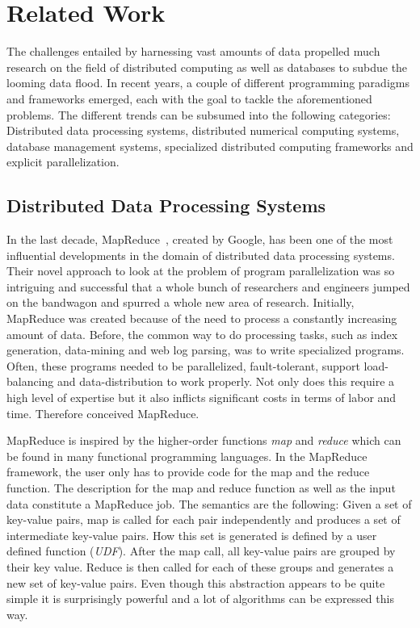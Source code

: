 \chapter{Related Work}
\label{cha:relatedwork}


The challenges entailed by harnessing vast amounts of data propelled much research on the field of distributed computing as well as databases to subdue the looming data flood.
In recent years, a couple of different programming paradigms and frameworks emerged, each with the goal to tackle the aforementioned problems.
The different trends can be subsumed into the following categories: Distributed data processing systems, distributed numerical computing systems, database management systems, specialized distributed computing frameworks and explicit parallelization.

\section{Distributed Data Processing Systems}

In the last decade, MapReduce~\cite{dean:c2008a}, created by Google, has been one of the most influential developments in the domain of distributed data processing systems.
Their novel approach to look at the problem of program parallelization was so intriguing and successful that a whole bunch of researchers and engineers jumped on the bandwagon and spurred a whole new area of research.
Initially, MapReduce was created because of the need to process a constantly increasing amount of data.
Before, the common way to do processing tasks, such as index generation, data-mining and web log parsing, was to write specialized programs.
Often, these programs needed to be parallelized, fault-tolerant, support load-balancing and data-distribution to work properly.
Not only does this require a high level of expertise but it also inflicts significant costs in terms of labor and time.
Therefore \citeauthor{dean:c2008a} conceived MapReduce.

MapReduce is inspired by the higher-order functions \emph{map} and \emph{reduce} which can be found in many functional programming languages.
In the MapReduce framework, the user only has to provide code for the map and the reduce function.
The description for the map and reduce function as well as the input data constitute a MapReduce job.
The semantics are the following:
Given a set of key-value pairs, map is called for each pair independently and produces a set of intermediate key-value pairs.
How this set is generated is defined by a user defined function (\emph{UDF}).
After the map call, all key-value pairs are grouped by their key value.
Reduce is then called for each of these groups and generates a new set of key-value pairs.
Even though this abstraction appears to be quite simple it is surprisingly powerful and a lot of algorithms can be expressed this way.

